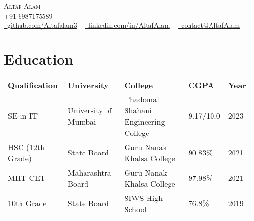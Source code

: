 \documentclass[letterpaper,11pt]{article}
\begin{document}

\begin{center}
    {\huge \scshape Altaf Alam} \\ \vspace{4pt}
    {\scshape +91 9987175589} \\ \vspace{4pt}
    \small
    \faGithub \href{https://github.com/Altafalam3}{\raisebox{-0.2\height}\ github.com/Altafalam3} ~
    \faLinkedin \href{https://linkedin.com/in/altaf-alam-432849234}{\raisebox{-0.2\height}\ linkedin.com/in/AltafAlam} ~
    \faEnvelope \href{mailto:contact@altaf.alam0032@gmail.com}{\raisebox{-0.2\height}\  contact@AltafAlam}
    \vspace{1pt}
\end{center}


\section{Education}
    \vspace{-4pt}
    \begin{itemize}[leftmargin=0.2in, label={}]
        {\item{
            \begin{tabular}{ l@{\hskip 0.2in} l@{\hskip 0.2in} l@{\hskip 0.2in} l@{\hskip 0.2in} l }
                 \textbf{Qualification} & \textbf{University} & \textbf{College} & \textbf{CGPA} & \textbf{Year} \\
                 SE in IT & University of Mumbai & Thadomal Shahani Engineering College & 9.17/10.0 & 2023  \\
                 HSC (12th Grade) & State Board & Guru Nanak Khalsa College & 90.83\% & 2021 \\
                 MHT CET & Maharashtra Board & Guru Nanak Khalsa College & 97.98\% & 2021 \\
                 10th Grade & State Board & SIWS High School & 76.8\% & 2019
            \end{tabular}
        }}
    \end{itemize}
\vspace{-8pt}
\end{document}
